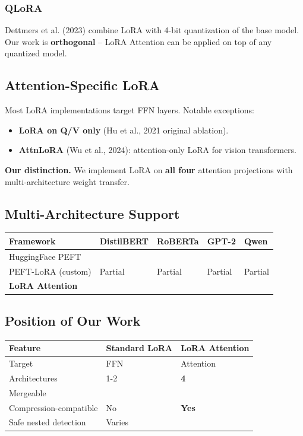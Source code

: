 \subsubsection{QLoRA}

Dettmers et al. (2023) combine LoRA with 4-bit quantization of the base 
model. Our work is \textbf{orthogonal} -- LoRA Attention can be applied on top of 
any quantized model.

\subsection{Attention-Specific LoRA}

Most LoRA implementations target FFN layers. Notable exceptions:
\begin{itemize}
\item \textbf{LoRA on Q/V only} (Hu et al., 2021 original ablation).
\item \textbf{AttnLoRA} (Wu et al., 2024): attention-only LoRA for vision transformers.

\end{itemize}
\textbf{Our distinction.} We implement LoRA on \textbf{all four} attention 
projections with multi-architecture weight transfer.

\subsection{Multi-Architecture Support}

\begin{table}[H]
\centering
\small
\begin{tabular}{lllll}
\toprule
\textbf{Framework} & \textbf{DistilBERT} & \textbf{RoBERTa} & \textbf{GPT-2} & \textbf{Qwen} \\
\midrule
HuggingFace PEFT &  &  &  &  \\
PEFT-LoRA (custom) & Partial & Partial & Partial & Partial \\
\textbf{LoRA Attention} &  &  &  &  \\
\bottomrule
\end{tabular}
\end{table}

\subsection{Position of Our Work}

\begin{table}[H]
\centering
\small
\begin{tabular}{lll}
\toprule
\textbf{Feature} & \textbf{Standard LoRA} & \textbf{LoRA Attention} \\
\midrule
Target & FFN & Attention \\
Architectures & 1-2 & \textbf{4} \\
Mergeable &  &  \\
Compression-compatible & No & \textbf{Yes} \\
Safe nested detection & Varies &  \\
\bottomrule
\end{tabular}
\end{table}

